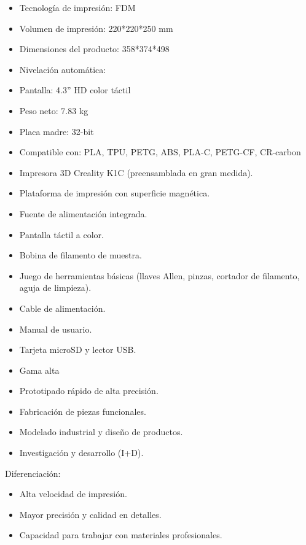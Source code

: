 \documentclass[compacto,5pt,comentarios]{aleph-notas}
\begin{document}
\begin{car}
\begin{itemize}
    \item Tecnología de impresión: FDM
    \item Volumen de impresión: 220*220*250 mm
    \item Dimensiones del producto: 358*374*498
    \item Nivelación automática:
    \item Pantalla: 4.3'' HD color táctil
    \item Peso neto: 7.83 kg
    \item Placa madre: 32-bit
    \item Compatible con: PLA, TPU, PETG, ABS, PLA-C, PETG-CF, CR-carbon
\end{itemize}
\end{car}
\begin{cont}
\begin{itemize}
    \item Impresora 3D Creality K1C (preensamblada en gran medida).
    \item Plataforma de impresión con superficie magnética.
    \item Fuente de alimentación integrada.
    \item Pantalla táctil a color.
    \item Bobina de filamento de muestra.
    \item Juego de herramientas básicas (llaves Allen, pinzas, cortador de filamento, aguja de limpieza).
    \item Cable de alimentación.
    \item Manual de usuario.
    \item Tarjeta microSD y lector USB.
\end{itemize}
\end{cont}
\begin{aplic}
\begin{itemize}
    \item Gama alta
    \item Prototipado rápido de alta precisión.
    \item Fabricación de piezas funcionales.
    \item Modelado industrial y diseño de productos.
    \item Investigación y desarrollo (I+D).
\end{itemize}
Diferenciación:
\begin{itemize}
    \item Alta velocidad de impresión.
    \item Mayor precisión y calidad en detalles.
    \item Capacidad para trabajar con materiales profesionales.
\end{itemize}
\end{aplic}
\end{document}
